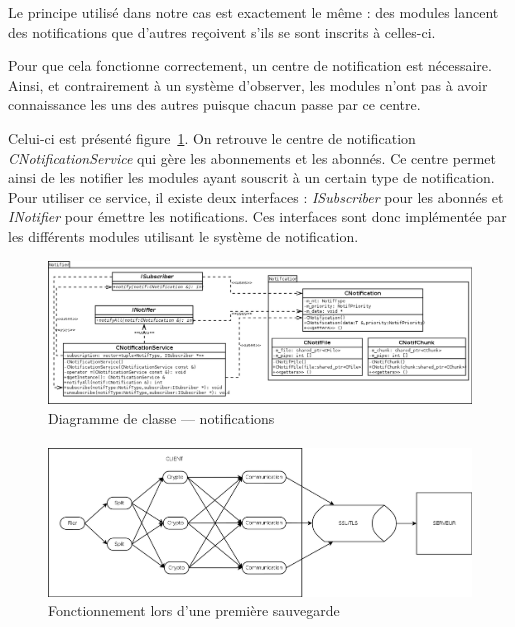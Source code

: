 \documentclass[a4paper,10pt, twoside]{report}
\begin{document}
\begin{spacing}{1.2}
Le principe utilis\'e dans notre cas est exactement le m\^eme : des modules
lancent des notifications que d'autres re\c{c}oivent s'ils se sont inscrits \`a
celles-ci.

Pour que cela fonctionne correctement, un centre de notification est
n\'ecessaire. Ainsi, et contrairement \`a un syst\`eme d'\flqq observer\frqq,
les modules n'ont pas \`a avoir connaissance les uns des autres puisque chacun
passe par ce centre.

Celui-ci est pr\'esent\'e figure~\ref{classDiagramNotif}. On retrouve le
centre de notification \textit{CNotificationService} qui g\`ere les
abonnements et les abonn\'es. Ce centre permet ainsi de les notifier les modules
ayant souscrit \`a un certain type de notification. Pour utiliser ce service,
il existe deux interfaces : \textit{ISubscriber} pour les abonn\'es et
\textit{INotifier} pour \'emettre les notifications. Ces interfaces sont donc
impl\'ement\'ee par les diff\'erents modules utilisant le syst\`eme de
notification.

\begin{figure}[h!]
  \hspace{-4.5em}
  \includegraphics[width=19cm]{softwareDesign/classDiagramNotif.png}
  \caption{\label{classDiagramNotif} Diagramme de classe --- notifications}
\end{figure}

\paragraph{}
\begin{figure}[h!]
  \hspace{-1.5em}
  \includegraphics[width=17cm]{softwareDesign/moduleInteraction.png}
  \caption{\label{interactModule} Fonctionnement lors d'une premi\`ere
  sauvegarde}
\end{figure}


\end{spacing}
\end{document}
